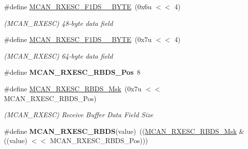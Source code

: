 \begin{DoxyCompactItemize}
\mbox{\label{group__SAME70__MCAN_ga616d23bbeb5655290510c1fc70da1a2b}} 
\#define \mbox{\hyperlink{group__SAME70__MCAN_ga616d23bbeb5655290510c1fc70da1a2b}{M\+C\+A\+N\+\_\+\+R\+X\+E\+S\+C\+\_\+\+F1\+D\+S\+\_\+\_\+\+B\+Y\+TE}}~(0x6u $<$$<$ 4)
\begin{DoxyCompactList}\small\item\em (M\+C\+A\+N\+\_\+\+R\+X\+E\+SC) 48-\/byte data field \end{DoxyCompactList}\item 
\mbox{\label{group__SAME70__MCAN_ga7c94a95637b3dfb6c639540cb76da614}} 
\#define \mbox{\hyperlink{group__SAME70__MCAN_ga7c94a95637b3dfb6c639540cb76da614}{M\+C\+A\+N\+\_\+\+R\+X\+E\+S\+C\+\_\+\+F1\+D\+S\+\_\+\_\+\+B\+Y\+TE}}~(0x7u $<$$<$ 4)
\begin{DoxyCompactList}\small\item\em (M\+C\+A\+N\+\_\+\+R\+X\+E\+SC) 64-\/byte data field \end{DoxyCompactList}\item 
\mbox{\label{group__SAME70__MCAN_ga6a542a813e8c7a137fda2502e8a9d3e4}} 
\#define {\bfseries M\+C\+A\+N\+\_\+\+R\+X\+E\+S\+C\+\_\+\+R\+B\+D\+S\+\_\+\+Pos}~8
\item 
\mbox{\label{group__SAME70__MCAN_gafcfb4aae53ca3b3c10574df33a9dd076}} 
\#define \mbox{\hyperlink{group__SAME70__MCAN_gafcfb4aae53ca3b3c10574df33a9dd076}{M\+C\+A\+N\+\_\+\+R\+X\+E\+S\+C\+\_\+\+R\+B\+D\+S\+\_\+\+Msk}}~(0x7u $<$$<$ M\+C\+A\+N\+\_\+\+R\+X\+E\+S\+C\+\_\+\+R\+B\+D\+S\+\_\+\+Pos)
\begin{DoxyCompactList}\small\item\em (M\+C\+A\+N\+\_\+\+R\+X\+E\+SC) Receive Buffer Data Field Size \end{DoxyCompactList}\item 
\mbox{\label{group__SAME70__MCAN_ga5d858ba35dc64a1b72ea58b8ecf8ce11}} 
\#define {\bfseries M\+C\+A\+N\+\_\+\+R\+X\+E\+S\+C\+\_\+\+R\+B\+DS}(value)~((\mbox{\hyperlink{group__SAMV71__MCAN_gafcfb4aae53ca3b3c10574df33a9dd076}{M\+C\+A\+N\+\_\+\+R\+X\+E\+S\+C\+\_\+\+R\+B\+D\+S\+\_\+\+Msk}} \& ((value) $<$$<$ M\+C\+A\+N\+\_\+\+R\+X\+E\+S\+C\+\_\+\+R\+B\+D\+S\+\_\+\+Pos)))
\item 
\mbox{\label{group__SAME70__MCAN_ga608dbb54cc832ce1f35d6d4d73be5c50}} 

\end{DoxyCompactItemize}
